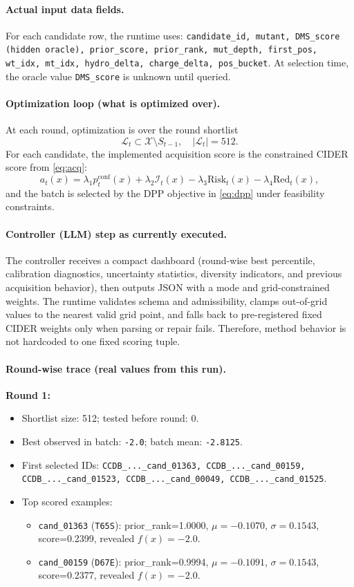 \documentclass{article}
\newcommand{\method}{\textsc{CIDER}}
\newcommand{\xset}{\mathcal X}
\begin{document}
\paragraph{Actual input data fields.}
For each candidate row, the runtime uses:
\texttt{candidate\_id, mutant, DMS\_score (hidden oracle), prior\_score, prior\_rank, mut\_depth, first\_pos, wt\_idx, mt\_idx, hydro\_delta, charge\_delta, pos\_bucket}.
At selection time, the oracle value \texttt{DMS\_score} is unknown until queried.

\paragraph{Optimization loop (what is optimized over).}
At each round, optimization is over the round shortlist
\[
\mathcal L_t \subset \xset\setminus S_{t-1},\quad |\mathcal L_t|=512.
\]
For each candidate, the implemented acquisition score is the constrained \method{} score from \cref{eq:acq}:
\[
a_t(x)=\lambda_1 p_t^{\mathrm{conf}}(x)+\lambda_2\mathcal I_t(x)-\lambda_3\mathrm{Risk}_t(x)-\lambda_4\mathrm{Red}_t(x),
\]
and the batch is selected by the DPP objective in \cref{eq:dpp} under feasibility constraints.

\paragraph{Controller (LLM) step as currently executed.}
The controller receives a compact dashboard (round-wise best percentile, calibration diagnostics, uncertainty statistics, diversity indicators, and previous acquisition behavior), then outputs JSON with a mode and grid-constrained weights. The runtime validates schema and admissibility, clamps out-of-grid values to the nearest valid grid point, and falls back to pre-registered fixed \method{} weights only when parsing or repair fails. Therefore, method behavior is not hardcoded to one fixed scoring tuple.

\paragraph{Round-wise trace (real values from this run).}
\textbf{Round 1:}
\begin{itemize}
\item Shortlist size: 512; tested before round: 0.
\item Best observed in batch: \texttt{-2.0}; batch mean: \texttt{-2.8125}.
\item First selected IDs:
\texttt{CCDB\_...\_cand\_01363, CCDB\_...\_cand\_00159, CCDB\_...\_cand\_01523, CCDB\_...\_cand\_00049, CCDB\_...\_cand\_01525}.
\item Top scored examples:
\begin{itemize}
\item \texttt{cand\_01363} (\texttt{T65S}): prior\_rank=1.0000, $\mu=-0.1070$, $\sigma=0.1543$, score=0.2399, revealed $f(x)=-2.0$.
\item \texttt{cand\_00159} (\texttt{D67E}): prior\_rank=0.9994, $\mu=-0.1091$, $\sigma=0.1543$, score=0.2377, revealed $f(x)=-2.0$.
\end{itemize}
\end{itemize}
\end{document}
